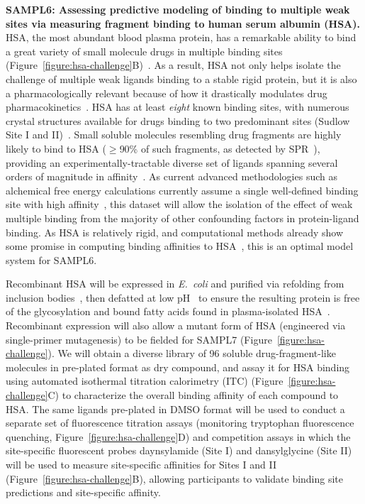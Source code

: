 \documentclass[11pt]{article}
\begin{document}
{\bf SAMPL6: Assessing predictive modeling of binding to multiple weak sites via measuring fragment binding to human serum albumin (HSA).}
HSA, the most abundant blood plasma protein, has a remarkable ability to bind a great variety of small molecule drugs in multiple binding sites (Figure~\ref{figure:hsa-challenge}B)~\cite{Fasano:2005:IUBMBLife(InternationalUnionofBiochemistryandMolecularBiology:Life)}.
As a result, HSA not only helps isolate the challenge of multiple weak ligands binding to a stable rigid protein, but it is also a pharmacologically relevant because of how it drastically modulates drug pharmacokinetics~\cite{Hall:2013:JournalofChemicalInformationandModeling}.
HSA has at least \emph{eight} known binding sites, with numerous crystal structures available for drugs binding to two predominant sites (Sudlow Site I and II)~\cite{Hall:2013:JournalofChemicalInformationandModeling}.
Small soluble molecules resembling drug fragments are highly likely to bind to HSA ($\ge$90\% of such fragments, as detected by SPR~\cite{Elinder:2011:JournalofBiomolecularScreening}), providing an experimentally-tractable diverse set of ligands spanning several orders of magnitude in affinity~\cite{Elinder:2011:JournalofBiomolecularScreening}.
As current advanced methodologies such as alchemical free energy calculations currently assume a single well-defined binding site with high affinity~\cite{Gilson:1997:BiophysicalJournal}, this dataset will allow the isolation of the effect of weak multiple binding from the majority of other confounding factors in protein-ligand binding.
As HSA is relatively rigid, and computational methods already show some promise in computing binding affinities to HSA~\cite{Hall:2013:JournalofChemicalInformationandModeling,Lexa:2014:PLoSONE,Evoli:2016:bioRxiv}, this is an optimal model system for SAMPL6.

Recombinant HSA will be expressed in \emph{E.~coli} and purified via refolding from inclusion bodies~\cite{Latta:1987:Bio/Technology}, then defatted at low pH~\cite{Lang:2015:BiotechnologyProgress} to ensure the resulting protein is free of the glycosylation and bound fatty acids found in plasma-isolated HSA~\cite{Lang:2015:BiotechnologyProgress}.
Recombinant expression will also allow a mutant form of HSA (engineered via single-primer mutagenesis) to be fielded for SAMPL7 (Figure~\ref{figure:hsa-challenge}).
We will obtain a diverse library of 96 soluble drug-fragment-like molecules in pre-plated format as dry compound, and assay it for HSA binding using automated isothermal titration calorimetry (ITC) (Figure~\ref{figure:hsa-challenge}C) to characterize the overall binding affinity of each compound to HSA.
The same ligands pre-plated in DMSO format will be used to conduct a separate set of fluorescence titration assays (monitoring tryptophan fluorescence quenching, Figure~\ref{figure:hsa-challenge}D) and competition assays in which the site-specific fluorescent probes daynsylamide (Site I) and dansylglycine (Site II) will be used to measure site-specific affinities for Sites I and II (Figure~\ref{figure:hsa-challenge}B), allowing participants to validate binding site predictions and site-specific affinity.
\end{document}

